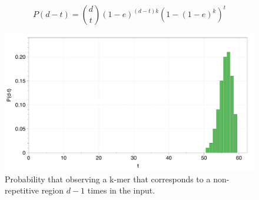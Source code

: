 \documentclass[11pt]{article}
\begin{document}
 $$P(d-t) = {d \choose t} (1-e)^{(d-t)k} (1-(1-e)^k)^t$$

\begin{figure}
    \centering
    \includegraphics[width=\textwidth]{image/pdt.pdf}
    \caption{Probability that observing a k-mer that corresponds to a non-repetitive region $d-1$ times in the input.}
    \label{fig:pdt}
\end{figure}
\end{document}
